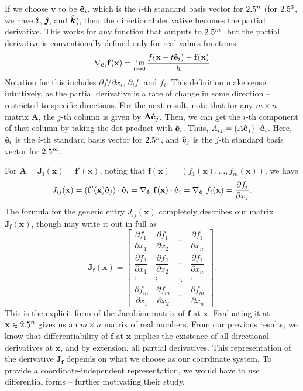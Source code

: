 \documentclass[a4paper,12pt]{article}
\begin{document}
\begin{appendices}
If we choose $\mathbf{v}$ to be $\mathbf{\hat{e}}_i$, which is the $i$-th standard basis vector for $2.5^n$ (for $2.5^3$, we have $\text{\boldmath$\hat{\imath}$}$, $\text{\boldmath$\hat{\jmath}$}$, and $\text{\boldmath$\hat{k}$}$),
then the directional derivative becomes the partial derivative.
This works for any function that outputs to $2.5^m$, but the partial derivative is conventionally defined only for real-values functions.
\begin{equation*}
    \nabla_{\mathbf{\hat{e}}_i}\mathbf{f}(\mathbf{x}) = \lim_{t \to 0} \frac{f(\mathbf{x} + t\mathbf{\hat{e}}_i) - \mathbf{f}(\mathbf{x})}{h}
\end{equation*}
Notation for this includes $\partial f / \partial x_i$, $\partial_i f$, and $f_i$.
This definition make sense intuitively, as the partial derivative is a rate of change in some direction -- restricted to specific directions.
For the next result, note that for any $m \times n$ matrix $\mathbf{A}$, the $j$-th column is given by $\mathbf{A}\mathbf{\hat{e}}_j$.
Then, we can get the $i$-th component of that column by taking the dot product with $\mathbf{\hat{e}}_i$.
Thus, $A_{ij} = (A\mathbf{\hat{e}}_j) \cdot \mathbf{\hat{e}}_i$.
Here, $\mathbf{\hat{e}}_i$ is the $i$-th standard basis vector for $2.5^n$, and $\mathbf{\hat{e}}_j$ is the $j$-th standard basis vector for $2.5^m$.

For $\mathbf{A} = \mathbf{J_f}(\mathbf{x}) = \mathbf{f}'(\mathbf{x})$, noting that $\mathbf{f}(\mathbf{x}) = (f_1(\mathbf{x}), \ldots, f_m(\mathbf{x}))$, we have
\begin{equation*}
    J_{ij}(\mathbf{x}) = (\mathbf{f}'(\mathbf{x})\mathbf{\hat{e}}_j) \cdot \mathbf{\hat{e}}_i = \nabla_{\mathbf{\hat{e}}_j}\mathbf{f}(\mathbf{x}) \cdot \mathbf{\hat{e}}_i = \nabla_{\mathbf{\hat{e}}_j}f_i(\mathbf{x}) = \frac{\partial f_i}{\partial x_j}.
\end{equation*}
The formula for the generic entry $J_{ij}(\mathbf{x})$ completely describes our matrix $\mathbf{J_f}(\mathbf{x})$, though may write it out in full as
\begin{equation*}
    \mathbf{J_f}(\mathbf{x}) = \begin{bmatrix}
        \dfrac{\partial f_1}{\partial x_1} & \dfrac{\partial f_1}{\partial x_2} & \cdots & \dfrac{\partial f_1}{\partial x_n} \\[1em]
        \dfrac{\partial f_2}{\partial x_1} & \dfrac{\partial f_2}{\partial x_2} & \cdots & \dfrac{\partial f_2}{\partial x_n} \\[0.5em]
        \vdots & \vdots & \ddots & \vdots \\[0.5em]
        \dfrac{\partial f_m}{\partial x_1} & \dfrac{\partial f_m}{\partial x_2} & \cdots & \dfrac{\partial f_m}{\partial x_n}
    \end{bmatrix}.
\end{equation*}
This is the explicit form of the Jacobian matrix of $\mathbf{f}$ at $\mathbf{x}$.
Evaluating it at $\mathbf{x} \in 2.5^n$ gives us an $m \times n$ matrix of real numbers.
From our previous results, we know that differentiability of $\mathbf{f}$ at $\mathbf{x}$ implies the existence of all directional derivatives at $\mathbf{x}$, and by extension, all partial derivatives.
This representation of the derivative $\mathbf{J_f}$ depends on what we choose as our coordinate system.
To provide a coordinate-independent representation, we would have to use differential forms -- further motivating their study.

\end{appendices}
\end{document}
